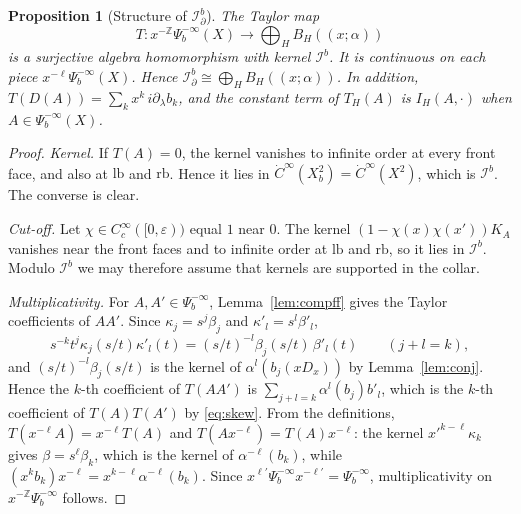 \documentclass[11pt,oneside,reqno]{article}
\newcommand{\Z}{\mathbb Z}
\newcommand{\Ib}{\mathcal I^b}
\newcommand{\Idb}{\mathcal I^b_\partial}
\theoremstyle{plain}
\newtheorem{proposition}[theorem]{Proposition}
\theoremstyle{definition}
\theoremstyle{remark}
\newcommand{\Lser}[1]{(\!(#1)\!)}
\begin{document}
\begin{proposition}[Structure of \(\Idb\)]\label{prop:structure}
The Taylor map
\[
 T:x^{-\Z}\Psi_b^{-\infty}(X)\longrightarrow\bigoplus_HB_H\Lser{x;\alpha}
\]
is a surjective algebra homomorphism with kernel \(\Ib\). It is
continuous on each piece \(x^{-\ell}\Psi_b^{-\infty}(X)\). Hence \(\Idb\cong\bigoplus_HB_H\Lser{x;\alpha}\). In addition,
\(T(D(A))=\sum_kx^k\,i\partial_\lambda b_k\), and the constant term of
\(T_H(A)\) is \(I_H(A,\cdot)\) when \(A\in\Psi_b^{-\infty}(X)\).
\end{proposition}

\begin{proof}
\emph{Kernel.} If \(T(A)=0\), the kernel vanishes to infinite order at every
front face, and also at \(\mathrm{lb}\) and \(\mathrm{rb}\). Hence it lies
in \(\dot C^\infty(X_b^2)=\dot C^\infty(X^2)\), which is \(\Ib\). The
converse is clear.

\emph{Cut-off.} Let \(\chi\in C_c^\infty([0,\varepsilon))\) equal \(1\) near
\(0\). The kernel \((1-\chi(x)\chi(x'))K_A\) vanishes near the front faces
and to infinite order at \(\mathrm{lb}\) and \(\mathrm{rb}\), so it lies in
\(\Ib\). Modulo \(\Ib\) we may therefore assume that kernels are supported
in the collar.

\emph{Multiplicativity.} For \(A,A'\in\Psi_b^{-\infty}\),
Lemma~\ref{lem:compff} gives the Taylor coefficients of \(AA'\). Since
\(\kappa_j=s^j\beta_j\) and \(\kappa'_l=s^l\beta'_l\),
\[
 s^{-k}t^j\kappa_j(s/t)\kappa'_l(t)
 =(s/t)^{-l}\beta_j(s/t)\,\beta'_l(t)\qquad(j+l=k),
\]
and \((s/t)^{-l}\beta_j(s/t)\) is the kernel of \(\alpha^l(b_j(xD_x))\) by
Lemma~\ref{lem:conj}. Hence the \(k\)-th coefficient of \(T(AA')\) is
\(\sum_{j+l=k}\alpha^l(b_j)b'_l\), which is the \(k\)-th coefficient of
\(T(A)T(A')\) by \eqref{eq:skew}. From the definitions,
\(T(x^{-\ell}A)=x^{-\ell}T(A)\) and \(T(Ax^{-\ell})=T(A)x^{-\ell}\): the
kernel \(x'^{k-\ell}\kappa_k\) gives \(\beta=s^{\ell}\beta_k\), which is the
kernel of \(\alpha^{-\ell}(b_k)\), while
\((x^kb_k)x^{-\ell}=x^{k-\ell}\alpha^{-\ell}(b_k)\). Since
\(x^{\ell'}\Psi_b^{-\infty}x^{-\ell'}=\Psi_b^{-\infty}\), multiplicativity
on \(x^{-\Z}\Psi_b^{-\infty}\) follows.


\end{proof}
\end{document}
